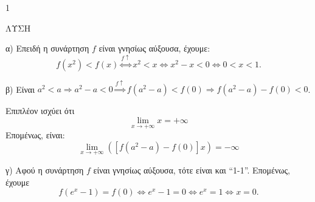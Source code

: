 \begin{ylh}{1}
    \item [Ύλη από εικόνα]
\end{ylh}
ΛΥΣΗ
\begin{alist}
\item α) Επειδή η συνάρτηση $f$ είναι γνησίως αύξουσα, έχουμε:
\[ f(x^2) < f(x) \overset{f \uparrow}{\iff} x^2 < x \iff x^2 - x < 0 \iff 0 < x < 1. \]
\item β) Είναι $a^2 < a \Rightarrow a^2 - a < 0 \overset{f \uparrow}{\Rightarrow} f(a^2 - a) < f(0) \Rightarrow f(a^2 - a) - f(0) < 0$.

Επιπλέον ισχύει ότι
\[ \lim_{x \to +\infty} x = +\infty \]
Επομένως, είναι:
\[ \lim_{x \to +\infty} ([f(a^2 - a) - f(0)] x) = -\infty \]
\item γ) Αφού η συνάρτηση $f$ είναι γνησίως αύξουσα, τότε είναι και ``1-1''. Επομένως, έχουμε
\[ f(e^x - 1) = f(0) \iff e^x - 1 = 0 \iff e^x = 1 \iff x = 0. \]
\end{alist}